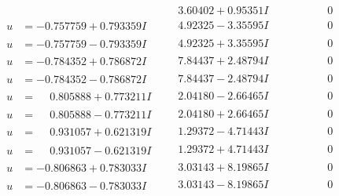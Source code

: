 \documentclass[1p]{elsarticle_modified}
\theoremstyle{definition}
\begin{document}
$$\begin{array}{c|c|c}
 & \phantom{-}3.60402 + 0.95351 I & \phantom{-0.000000 } 0 \\ \hline\begin{aligned}
u &= -0.757759 + 0.793359 I\end{aligned}
 & \phantom{-}4.92325 - 3.35595 I & \phantom{-0.000000 } 0 \\ \hline\begin{aligned}
u &= -0.757759 - 0.793359 I\end{aligned}
 & \phantom{-}4.92325 + 3.35595 I & \phantom{-0.000000 } 0 \\ \hline\begin{aligned}
u &= -0.784352 + 0.786872 I\end{aligned}
 & \phantom{-}7.84437 + 2.48794 I & \phantom{-0.000000 } 0 \\ \hline\begin{aligned}
u &= -0.784352 - 0.786872 I\end{aligned}
 & \phantom{-}7.84437 - 2.48794 I & \phantom{-0.000000 } 0 \\ \hline\begin{aligned}
u &= \phantom{-}0.805888 + 0.773211 I\end{aligned}
 & \phantom{-}2.04180 - 2.66465 I & \phantom{-0.000000 } 0 \\ \hline\begin{aligned}
u &= \phantom{-}0.805888 - 0.773211 I\end{aligned}
 & \phantom{-}2.04180 + 2.66465 I & \phantom{-0.000000 } 0 \\ \hline\begin{aligned}
u &= \phantom{-}0.931057 + 0.621319 I\end{aligned}
 & \phantom{-}1.29372 - 4.71443 I & \phantom{-0.000000 } 0 \\ \hline\begin{aligned}
u &= \phantom{-}0.931057 - 0.621319 I\end{aligned}
 & \phantom{-}1.29372 + 4.71443 I & \phantom{-0.000000 } 0 \\ \hline\begin{aligned}
u &= -0.806863 + 0.783033 I\end{aligned}
 & \phantom{-}3.03143 + 8.19865 I & \phantom{-0.000000 } 0 \\ \hline\begin{aligned}
u &= -0.806863 - 0.783033 I\end{aligned}
 & \phantom{-}3.03143 - 8.19865 I & \phantom{-0.000000 } 0 \\ \hline\begin{aligned}

\end{aligned}
\end{array}$$
\end{document}
